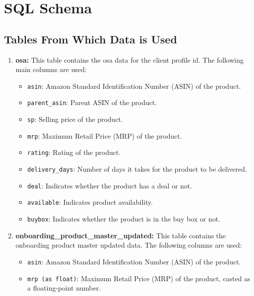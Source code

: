 \section{SQL Schema}

\subsection{Tables From Which Data is Used}

\begin{enumerate}
    \item \textbf{osa:} This table contains the osa data for the client profile id. The following main columns are used:
          \begin{itemize}
              \item \texttt{asin}: Amazon Standard Identification Number (ASIN) of the product.
              \item \texttt{parent\_asin}: Parent ASIN of the product.
              \item \texttt{sp}: Selling price of the product.
              \item \texttt{mrp}: Maximum Retail Price (MRP) of the product.
              \item \texttt{rating}: Rating of the product.
              \item \texttt{delivery\_days}: Number of days it takes for the product to be delivered.
              \item \texttt{deal}: Indicates whether the product has a deal or not.
              \item \texttt{available}: Indicates product availability.
              \item \texttt{buybox}: Indicates whether the product is in the buy box or not.
          \end{itemize}
    \item \textbf{onboarding\_product\_master\_updated:} This table contains the onboarding product master updated data. The following columns are used:
          \begin{itemize}
              \item \texttt{asin}: Amazon Standard Identification Number (ASIN) of the product.
              \item \texttt{mrp (as float)}: Maximum Retail Price (MRP) of the product, casted as a floating-point number.
          \end{itemize}
\end{enumerate}

